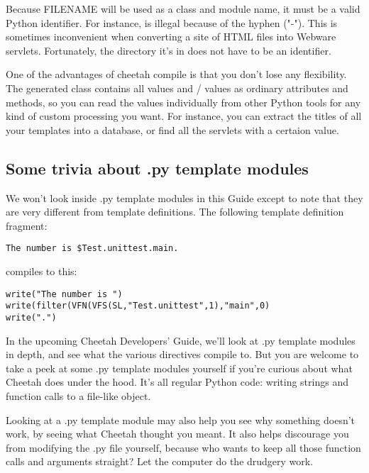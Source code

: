 Because FILENAME will be used as a class and module name, it must be a valid
Python identifier.  For instance,  is 
illegal because of the hyphen ("-").  This is sometimes inconvenient when
converting a site of HTML files into Webware servlets.  Fortunately, the
directory it's in does not have to be an identifier.

One of the advantages of cheetah compile is that you don't lose any
flexibility.  The generated class contains all  values and
/ values as ordinary attributes and methods, so you
can read the values individually from other Python tools for any kind of custom
processing you want.  For instance, you can extract the titles of all
your templates into a database, or find all the servlets with a certaion
 value.

\subsection{Some trivia about .py template modules}
\label{howWorks.pyTrivia}

We won't look inside .py template modules in this Guide except to note that
they are very different from template definitions.  The following template
definition fragment:

\begin{verbatim}
The number is $Test.unittest.main.
\end{verbatim}

compiles to this:

\begin{verbatim}
write("The number is ")  
write(filter(VFN(VFS(SL,"Test.unittest",1),"main",0)
write(".")
\end{verbatim}

In the upcoming Cheetah Developers' Guide, we'll look at .py template
modules in depth, and see what the various directives compile to.
But you are welcome to take a peek at some .py template modules yourself
if you're curious about what Cheetah does under the hood.  It's all
regular Python code: writing strings and function calls to a file-like
object.

Looking at a .py template module may also help you see why something
doesn't work, by seeing what Cheetah thought you meant.  It also helps 
discourage you from modifying the .py file yourself, because who wants to
keep all those function calls and arguments straight?  Let the computer
do the drudgery work.


